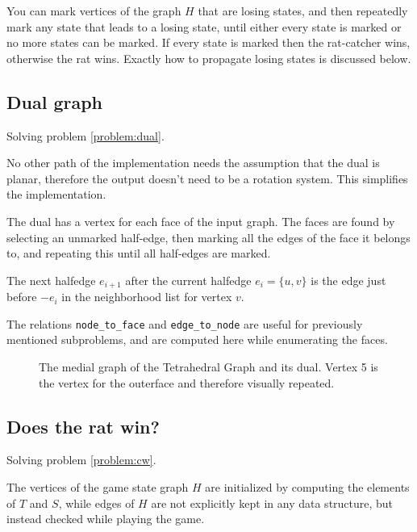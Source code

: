 \documentclass{article}
\begin{document}
		You can mark vertices of the graph $H$ that are losing states, and then repeatedly mark any state that leads to a losing state, until either every state is marked or no more states can be marked. If every state is marked then the rat-catcher wins, otherwise the rat wins. Exactly how to propagate losing states is discussed below.

		\subsection{Dual graph}\label{impl:dual}

			Solving problem \ref{problem:dual}.

			No other path of the implementation needs the assumption that the dual is planar, therefore the output doesn't need to be a rotation system. This simplifies the implementation.

			The dual has a vertex for each face of the input graph. The faces are found by selecting an unmarked half-edge, then marking all the edges of the face it belongs to, and repeating this until all half-edges are marked.

			The next halfedge $e_{i+1}$ after the current halfedge $e_i = \{u, v\}$ is the edge just before $-e_i$ in the neighborhood list for vertex $v$.
			
			The relations \texttt{node_to_face} and \texttt{edge_to_node} are useful for previously mentioned subproblems, and are computed here while enumerating the faces.


			\begin{figure}[H]
				\centering
				
				\caption{The medial graph of the Tetrahedral Graph and its dual. Vertex 5 is the vertex for the outerface and therefore visually repeated.}
				\label{fig:m}
			\end{figure}

		\subsection{Does the rat win?}

			Solving problem \ref{problem:cw}.

			The vertices of the game state graph $H$ are initialized by computing the elements of $T$ and $S$, while edges of $H$ are not explicitly kept in any data structure, but instead checked while playing the game.
\end{document}
